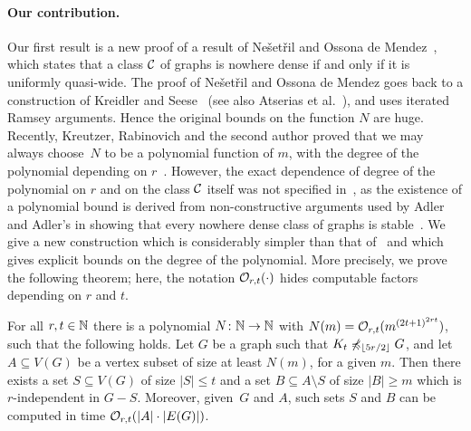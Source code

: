 
\paragraph{Our contribution.} 
Our first result is  a new proof of a result of
Ne\v{s}et\v{r}il and Ossona de Mendez~\cite{nevsetvril2010first},
which states that a class $\mathcal{C}$ of graphs is nowhere dense if and only if it
is uniformly quasi-wide. The proof of Ne\v{s}et\v{r}il 
and Ossona de Mendez goes back to a construction
of Kreidler and Seese~\cite{kreidler1998monadic} (see also Atserias et al.~\cite{atserias2006preservation}), 
and uses iterated Ramsey arguments. Hence the original bounds on 
the function $N$ are huge. Recently, Kreutzer, Rabinovich and the second author
 proved that we may always choose~$N$ to be a polynomial 
function of $m$, with the degree of the polynomial depending on $r$~\cite{siebertz2016polynomial}. However, the exact dependence of degree of the polynomial on $r$ and on the class $\mathcal{C}$ itself
 was  not specified in~\cite{siebertz2016polynomial}, as the existence of a polynomial bound is derived
from non-constructive arguments used by Adler and Adler's in showing that every nowhere dense class of graphs
is stable~\cite{adler2014interpreting}. We give a new construction 
which is considerably simpler than that of~\cite{siebertz2016polynomial}
and which gives explicit bounds on the degree of the polynomial. 
More precisely, we prove the following theorem; here, the notation $\mathcal{O}_{r,t}(\cdot)$ hides computable factors depending on $r$ and $t$.

\begin{theorem}\label{thm:new-uqw}
For all $r,t\in \mathbb{N}$ there is a polynomial  $N\colon \mathbb{N}\to \mathbb{N}$ with $N(m)=
\mathcal{O}_{r,t}{(m^{{(2t+1)}^{2rt}})}$, such that the following holds.
Let $G$ be a graph such that $K_t\not\preccurlyeq_{\lfloor 5r/2\rfloor} G$, and
let $A\subseteq V(G)$ be a vertex subset of size at least $N(m)$, for a given $m$.
Then there exists a set $S\subseteq V(G)$ of size $|S|\leq t$ and a set $B\subseteq A\setminus S$ 
of size $|B|\geq m$ which is $r$-independent in $G-S$.
Moreover, given~$G$ and $A$, such sets $S$ and $B$ can be computed in time $\mathcal{O}_{r,t}(|A|\cdot |E(G)|)$. 
\end{theorem}

